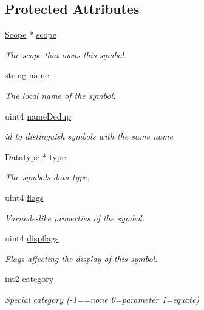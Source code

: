 \subsection*{Protected Attributes}
\begin{DoxyCompactItemize}
\item 
\mbox{\hyperlink{class_scope}{Scope}} $\ast$ \mbox{\hyperlink{class_symbol_a25a177c969ab3aa6b2bbd6e817deb0f4}{scope}}
\begin{DoxyCompactList}\small\item\em The scope that owns this symbol. \end{DoxyCompactList}\item 
string \mbox{\hyperlink{class_symbol_a0254b578a75d2bd6f7e145fe081cb6dd}{name}}
\begin{DoxyCompactList}\small\item\em The local name of the symbol. \end{DoxyCompactList}\item 
uint4 \mbox{\hyperlink{class_symbol_afe1f39b8146a552928c3d0d505a03efa}{name\+Dedup}}
\begin{DoxyCompactList}\small\item\em id to distinguish symbols with the same name \end{DoxyCompactList}\item 
\mbox{\hyperlink{class_datatype}{Datatype}} $\ast$ \mbox{\hyperlink{class_symbol_ab760cde69e8bb98988ba37871cb6fd63}{type}}
\begin{DoxyCompactList}\small\item\em The symbol\textquotesingle{}s data-\/type. \end{DoxyCompactList}\item 
uint4 \mbox{\hyperlink{class_symbol_ae27fc3f664b0edbd5cedf859acfb0707}{flags}}
\begin{DoxyCompactList}\small\item\em Varnode-\/like properties of the symbol. \end{DoxyCompactList}\item 
uint4 \mbox{\hyperlink{class_symbol_a58776a81e4ba35c90bb0d3bf2fea5c32}{dispflags}}
\begin{DoxyCompactList}\small\item\em Flags affecting the display of this symbol. \end{DoxyCompactList}\item 
int2 \mbox{\hyperlink{class_symbol_a4cbfc5ebf286a35b8f961618c2f2034c}{category}}
\begin{DoxyCompactList}\small\item\em Special category (-\/1==none 0=parameter 1=equate) \end{DoxyCompactList}\item 

\end{DoxyCompactItemize}
